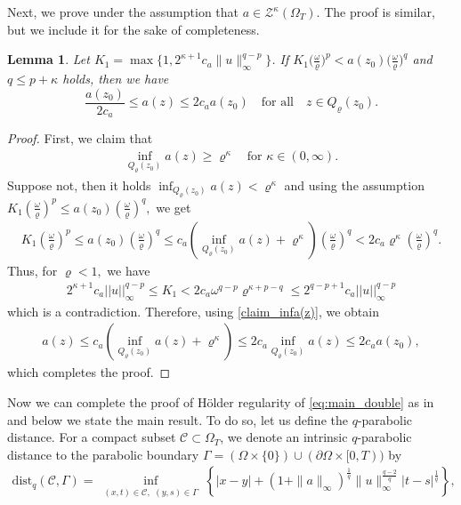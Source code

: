 \documentclass[10pt,a4paper]{amsart}
\newtheorem{lemma}[theorem]{Lemma}
\numberwithin{equation}{section}
\begin{document}
Next, we prove \cite[Lemma 4.1 ]{Kim2025holder} under the assumption that $a\in \mathcal{Z}^{\kappa}(\Omega_T)$. The proof is similar, but we include it for the sake of completeness.
 \begin{lemma}
    Let $K_1=\max \{1, 2^{\kappa+1}c_a\|u\|_\infty^{q-p}\}$. If $K_1\bigl( \tfrac{\omega}{\varrho}\bigr)^p<a(z_0)\bigl( \tfrac{\omega}{\varrho}\bigr)^q$ and $q\leq p+\kappa$ holds, then we have
    $$
        \frac{a(z_0)}{2c_a}\le a(z)\le 2c_a a(z_0)\quad\text{for all}\quad z\in Q_{\varrho}(z_0).
    $$
\end{lemma}
\begin{proof}
First, we claim that 
\begin{align}\label{claim_infa(z)}
\inf_{Q_{\varrho}(z_0)}a(z)\geq \varrho^{\kappa}\quad  \text{for } \kappa \in (0, \infty).
\end{align} 
Suppose not, then it holds $\inf_{Q_{\varrho}(z_0)}a(z)< \varrho^{\kappa}$ and using the assumption $K_1\left(\frac{\omega}{\varrho}\right)^p\leq a(z_0)\left(\frac{\omega}{\varrho}\right)^q,$ we get
\begin{align*}
    K_1\left(\frac{\omega}{\varrho}\right)^p\leq a(z_0)\left(\frac{\omega}{\varrho}\right)^q\leq c_a\left(\inf_{Q_{\varrho}(z_0)}a(z)+\varrho^{\kappa}\right)\left(\frac{\omega}{\varrho}\right)^q< 2c_a \varrho^{\kappa}\left(\frac{\omega}{\varrho}\right)^{q}.
\end{align*}
Thus, for $\varrho<1,$ we have
\begin{align*}
    2^{\kappa+1}c_a||u||^{q-p}_{\infty} \leq K_1< 2c_{a}\omega^{q-p}\varrho^{\kappa+p-q}\leq 2^{q-p+1}c_{a}||u||^{q-p}_{\infty}
\end{align*}
which is a contradiction. Therefore, using \eqref{claim_infa(z)}, we obtain
\begin{align*}
    a(z)\leq c_a\left(\inf_{Q_{\varrho}(z_0)}a(z)+\varrho^{\kappa}\right)\leq 2c_a \inf_{Q_{\varrho}(z_0)}a(z)\leq 2c_a a(z_0),
\end{align*}
which completes the proof.
\end{proof} 
Now we can complete the proof of H\"older regularity of \eqref{eq:main_double} as in \cite{Kim2025holder} and below we state the main result. To do so, let us define the $q$-parabolic distance. For a compact subset $\mathcal{C}\subset \Omega_T$, we denote an intrinsic  $q$-parabolic distance to the parabolic boundary $ \Gamma  = (\Omega \times \{0\}) \cup (\partial \Omega \times [0,T))$ by
\begin{align*}       
\text{dist}_q(\mathcal{C},\Gamma)=\inf_{\substack{(x,t) \in \mathcal{C}, \,\, (y,s) \in \Gamma  }} \left\{ |x-y| +(1+\|a\|_\infty)^\frac{1}{q} \|u\|_\infty^{\frac{q-2}{q}} |t-s|^\frac{1}{q} \right\},
\end{align*}
 
\end{document}

